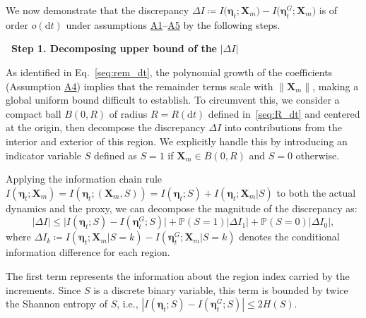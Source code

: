 \documentclass[
 longbibliography,
 twocolumn,
 superscriptaddress,
 amsmath,
 amssymb,
 amsthm,
 amsfonts,
 prl,
 floatfix,
]{revtex4-2}
\begin{document}
\begin{widetext}
We now demonstrate that the discrepancy $\Delta I\coloneq I\big(\bm\eta_t;\bm X_m) - I\big(\bm\eta_t^G;\bm X_m)$ is of order $o(\mathrm dt)$ under assumptions \hyperlink{assumption:A1}{A1}--\hyperlink{assumption:A5}{A5} by the following steps.

\bigskip
\noindent\textbf{\textbullet\ Step 1. Decomposing upper bound of the} $|\Delta I|$

As identified in Eq.~\eqref{seq:rem_dt}, the polynomial growth of the coefficients (Assumption \hyperlink{assumption:A4}{A4}) implies that the remainder terms scale with $\|\bm X_m\|$, making a global uniform bound difficult to establish. 
To circumvent this, we consider a compact ball $B(0, R)$ of radius $R=R(\mathrm dt)$ defined in~\eqref{seq:R_dt} and centered at the origin, then decompose the discrepancy $\Delta I$ into contributions from the interior and exterior of this region. We explicitly handle this by introducing an indicator variable $S$ defined as $S=1$ if $\bm X_m \in B(0, R)$ and $S=0$ otherwise.

Applying the information chain rule $I(\bm \eta_t; \bm X_m) = I(\bm \eta_t; (\bm X_m,S)) = I(\bm \eta_t; S) + I(\bm \eta_t; \bm X_m | S)$ to both the actual dynamics and the proxy, we can decompose the magnitude of the discrepancy as:
\begin{equation}
    |\Delta I| \le 
    \big| I(\bm \eta_t; S) - I(\bm \eta_t^G; S) \big| 
    + \mathbb P(S=1)|\Delta I_1| + \mathbb P(S=0)|\Delta I_0|,
    \label{seq:deltaI_first_decom}
\end{equation}
where $\Delta I_k \coloneq I(\bm \eta_t; \bm X_m | S=k) - I(\bm \eta_t^G; \bm X_m | S=k)$ denotes the conditional information difference for each region.

The first term represents the information about the region index carried by the increments. Since $S$ is a discrete binary variable, this term is bounded by twice the Shannon entropy of $S$, i.e., $|I(\bm \eta_t; S) - I(\bm \eta_t^G; S)| \le 2H(S)$.


\end{widetext}
\end{document}
